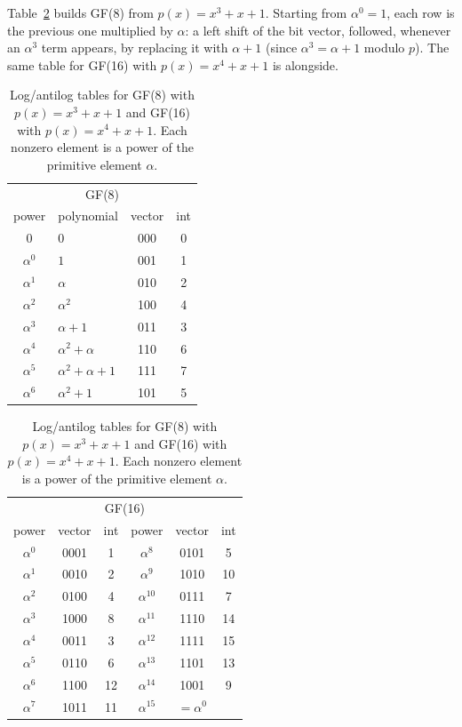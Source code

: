 
Table~\ref{tab:ch14:gf8} builds GF(8) from $p(x)=x^3+x+1$. Starting from $\alpha^0=1$, each
row is the previous one multiplied by $\alpha$: a left shift of the bit vector, followed, whenever
an $\alpha^3$ term appears, by replacing it with $\alpha+1$ (since $\alpha^3=\alpha+1$ modulo $p$).
The same table for GF(16) with $p(x)=x^4+x+1$ is alongside.

\begin{table}[htbp]\centering\small
\caption{Log/antilog tables for GF(8) with $p(x)=x^3+x+1$ and GF(16) with $p(x)=x^4+x+1$. Each
nonzero element is a power of the primitive element $\alpha$.}
\label{tab:ch14:gf8}
\begin{tabular}{@{}c l c c@{}}
\toprule
\multicolumn{4}{c}{GF(8)}\\
power & polynomial & vector & int\\
\midrule
$0$ & $0$ & 000 & 0\\
$\alpha^0$ & $1$ & 001 & 1\\
$\alpha^1$ & $\alpha$ & 010 & 2\\
$\alpha^2$ & $\alpha^2$ & 100 & 4\\
$\alpha^3$ & $\alpha+1$ & 011 & 3\\
$\alpha^4$ & $\alpha^2+\alpha$ & 110 & 6\\
$\alpha^5$ & $\alpha^2+\alpha+1$ & 111 & 7\\
$\alpha^6$ & $\alpha^2+1$ & 101 & 5\\
\bottomrule
\end{tabular}\qquad
\begin{tabular}{@{}c c c c c c@{}}
\toprule
\multicolumn{6}{c}{GF(16)}\\
power & vector & int & power & vector & int\\
\midrule
$\alpha^0$ & 0001 & 1 & $\alpha^8$ & 0101 & 5\\
$\alpha^1$ & 0010 & 2 & $\alpha^9$ & 1010 & 10\\
$\alpha^2$ & 0100 & 4 & $\alpha^{10}$ & 0111 & 7\\
$\alpha^3$ & 1000 & 8 & $\alpha^{11}$ & 1110 & 14\\
$\alpha^4$ & 0011 & 3 & $\alpha^{12}$ & 1111 & 15\\
$\alpha^5$ & 0110 & 6 & $\alpha^{13}$ & 1101 & 13\\
$\alpha^6$ & 1100 & 12 & $\alpha^{14}$ & 1001 & 9\\
$\alpha^7$ & 1011 & 11 & $\alpha^{15}$ & $=\alpha^0$ & \\
\bottomrule
\end{tabular}
\end{table}

